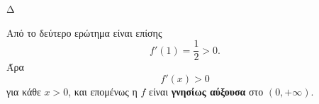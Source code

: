 \begin{thema}{Δ}
\begin{erwthma}
Από το δεύτερο ερώτημα είναι επίσης
\[
f'(1)=\frac{1}{2}>0.
\]
Άρα
\[
f'(x)>0
\]
για κάθε $x>0$, και επομένως η $f$ είναι \textbf{γνησίως αύξουσα} στο $(0,+\infty)$.
\end{erwthma}
\end{thema}
